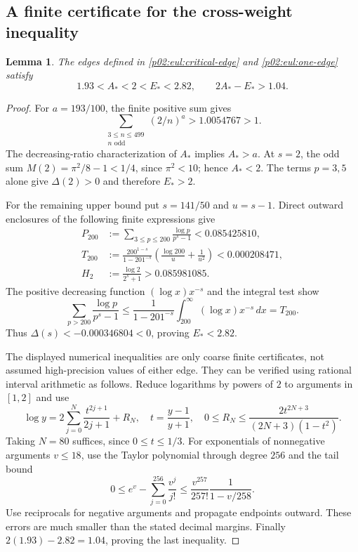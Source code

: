 \documentclass[11pt,letterpaper]{article}
\newtheorem{lemma}[theorem]{Lemma}
\theoremstyle{definition}
\theoremstyle{remark}
\newcommand{\1}{\mathbf 1}
\begin{document}
\subsection{A finite certificate for the cross-weight inequality}

\begin{lemma}\label{p02:lem:edge-enclosures}
The edges defined in \eqref{p02:eul:critical-edge} and
\eqref{p02:eul:one-edge} satisfy
\begin{equation}\label{p02:eq:edge-enclosures}
 1.93<A_*<2<E_*<2.82,
 \qquad 2A_*-E_*>1.04.
\end{equation}
\end{lemma}
\begin{proof}
For $a=193/100$, the finite positive sum gives
\[
 \sum_{\substack{3\le n\le499\\n\text{ odd}}}(2/n)^a
 >1.0054767>1.
\]
The decreasing-ratio characterization of $A_*$ implies $A_*>a$.
At $s=2$, the odd sum $M(2)=\pi^2/8-1<1/4$, since $\pi^2<10$;
hence $A_*<2$. The terms $p=3,5$ alone give
$\Delta(2)>0$ and therefore $E_*>2$.

For the remaining upper bound put $s=141/50$ and $u=s-1$. Direct
outward enclosures of the following finite expressions give
\begin{align*}
 P_{200}&:=\sum_{3\le p\le200}\frac{\log p}{p^s-1}
                       <0.085425810,\\
 T_{200}&:=\frac{200^{1-s}}{1-201^{-s}}
       \left(\frac{\log200}{u}+\frac1{u^2}\right)
                       <0.000208471,\\
 H_2&:=\frac{\log2}{2^s+1}>0.085981085.
\end{align*}
The positive decreasing function $(\log x)x^{-s}$ and the integral
test show
\[
 \sum_{p>200}\frac{\log p}{p^s-1}
 \le\frac1{1-201^{-s}}\int_{200}^\infty(\log x)x^{-s}\,dx
 =T_{200}.
\]
Thus $\Delta(s)<-0.000346804<0$, proving $E_*<2.82$.

The displayed numerical inequalities are only coarse finite
certificates, not assumed high-precision values of either edge.
They can be verified using rational interval arithmetic as follows.
Reduce logarithms by powers of $2$ to arguments in $[1,2]$ and use
\[
 \log y=2\sum_{j=0}^{N}\frac{t^{2j+1}}{2j+1}+R_N,
 \quad t=\frac{y-1}{y+1},\quad
 0\le R_N\le\frac{2t^{2N+3}}{(2N+3)(1-t^2)}.
\]
Taking $N=80$ suffices, since $0\le t\le1/3$. For exponentials of
nonnegative arguments $v\le18$, use the Taylor polynomial through
degree $256$ and the tail bound
\[
 0\le e^v-\sum_{j=0}^{256}\frac{v^j}{j!}
 \le\frac{v^{257}}{257!}\frac1{1-v/258}.
\]
Use reciprocals for negative arguments and propagate endpoints
outward. These errors are much smaller than the stated decimal
margins. Finally $2(1.93)-2.82=1.04$, proving the last inequality.
\end{proof}
\end{document}
